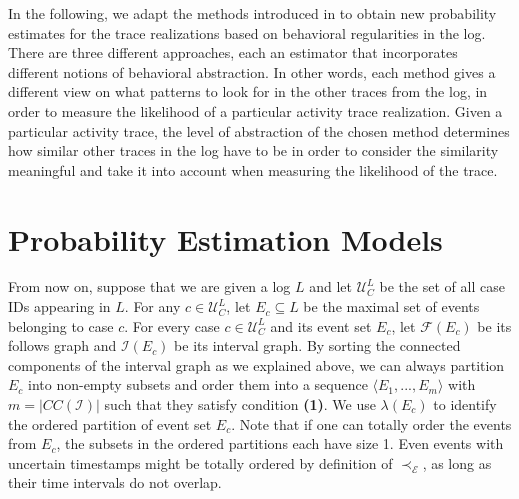 In the following, we adapt the methods introduced in \cite{por} to obtain new probability estimates for the trace realizations based on behavioral regularities in the log.
There are three different approaches, each an estimator that incorporates different notions of behavioral abstraction.
In other words, each method gives a different view on what patterns to look for in the other traces from the log, in order to measure the likelihood of a particular activity trace realization.
Given a particular activity trace, the level of abstraction of the chosen method determines how similar other traces in the log have to be in order to consider the similarity meaningful and take it into account when measuring the likelihood of the trace.


\section{Probability Estimation Models}
From now on, suppose that we are given a log $L$ and let $\mathcal{U}_C^L$ be the set of all case IDs appearing in $L$.
For any $c \in \mathcal{U}_C^L$, let $E_c \subseteq L$ be the maximal set of events belonging to case $c$.
For every case $c \in \mathcal{U}_C^L$ and its event set $E_c$, let $\mathcal{F}(E_c)$ be its follows graph and $\mathcal{I}(E_c)$ be its interval graph.
By sorting the connected components of the interval graph as we explained above, we can always partition $E_c$ into non-empty subsets and order them into a sequence $\langle E_1,...,E_m\rangle$ with $m=|CC(\mathcal{I})|$ such that they satisfy condition \textbf{(1)}.
We use $\lambda(E_c)$ to identify the ordered partition of event set $E_c$.
Note that if one can totally order the events from $E_c$, the subsets in the ordered partitions each have size 1.
Even events with uncertain timestamps might be totally ordered by definition of $\prec_{\mathcal{E}}$, as long as their time intervals do not overlap.


